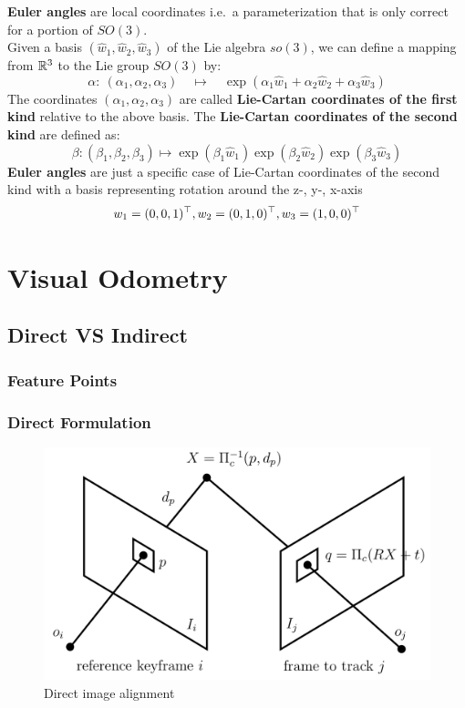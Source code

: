 \textbf{Euler angles} are local coordinates i.e.\ a parameterization
that is only correct for a portion of $SO(3)$.\\

Given a basis $(\widehat{w}_1, \widehat{w}_2, \widehat{w}_3)$
of the Lie algebra $so(3)$, we can define a mapping from $\mathbb{R}^3$
to the Lie group $SO(3)$ by:
\[ \alpha :\ (\alpha_1, \alpha_2, \alpha_3) \quad \mapsto \quad
	\exp( \alpha_1 \widehat{w}_1 + \alpha_2 \widehat{w}_2 + \alpha_3 \widehat{w}_3)
\]
The coordinates $(\alpha_1, \alpha_2, \alpha_3)$ are called
\textbf{Lie-Cartan coordinates of the first kind} relative to the above basis.
The \textbf{Lie-Cartan coordinates of the second kind} are defined as:
\[ \beta : (\beta_1, \beta_2, \beta_3) \mapsto
	\exp(\beta_1 \widehat{w}_1) \exp(\beta_2 \widehat{w}_2) \exp(\beta_3 \widehat{w}_3)
\]
\textbf{Euler angles} are just a specific case of Lie-Cartan coordinates
of the second kind with a basis representing rotation around
the z-, y-, x-axis
\[ w_1 = (0,0,1)^{\top}, w_2 = (0,1,0)^{\top}, w_3 = (1,0,0)^{\top} \]




\section{Visual Odometry}%
\label{sec:visual-odometry}

\subsection{Direct VS Indirect}%
\label{sub:direct-indirect}

\subsubsection{Feature Points}%
\label{ssub:feature-points}

\subsubsection{Direct Formulation}%
\label{ssub:direct-formulation}

\begin{figure}[ht]
	\centering
	\includegraphics[width=\linewidth]{assets/img/direct-image-alignment.png}
	\caption{Direct image alignment}%
	\label{fig:direct-image-alignment}
\end{figure}

